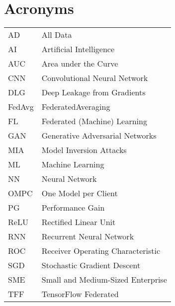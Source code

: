 \section*{Acronyms}
\begin{table}[H]
    \begin{tabular}{p{4cm} p{10cm}}
     AD & All Data \\
     AI & Artificial Intelligence \\
     AUC & Area under the Curve \\
     CNN & Convolutional Neural Network \\
     DLG & Deep Leakage from Gradients \\
     FedAvg & FederatedAveraging \\
     FL & Federated (Machine) Learning \\
     GAN & Generative Adversarial Networks \\
     MIA & Model Inversion Attacks \\
     ML & Machine Learning \\
     NN & Neural Network \\
     OMPC & One Model per Client \\
     PG & Performance Gain \\
     ReLU & Rectified Linear Unit \\
     RNN & Recurrent Neural Network \\
     ROC & Receiver Operating Characteristic \\
     SGD & Stochastic Gradient Descent \\
     SME & Small and Medium-Sized Enterprise \\
     TFF & TensorFlow Federated \\
    \end{tabular}%
\end{table}%
